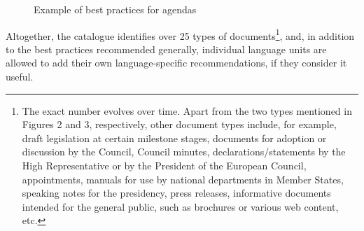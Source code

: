 \documentclass[output=paper]{langsci/langscibook}
\begin{document}
\begin{figure}
\caption{Example of best practices for agendas}
\label{fig:key:3}

\end{figure}

Altogether, the catalogue identifies over 25 types of documents\footnote{The exact number evolves over time. Apart from the two types mentioned in Figures 2 and 3, respectively, other document types include, for example, draft legislation at certain milestone stages, documents for adoption or discussion by the Council, Council minutes, declarations/statements by the High Representative or by the President of the European Council, appointments, manuals for use by national departments in Member States, speaking notes for the presidency, press releases, informative documents intended for the general public, such as brochures or various web content, etc.}, and, in addition to the best practices recommended generally, individual language units are allowed to add their own language-specific recommendations, if they consider it useful.
\end{document}
